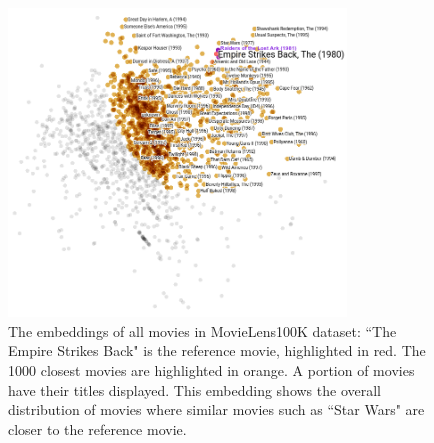 \documentclass[11pt,twocolumn]{article}
\begin{document}
\begin{figure}[!ht]\centering
	\includegraphics[width=0.8\textwidth]{movies-annotation}
	\caption{
		The embeddings of all movies in MovieLens100K dataset:
		``The Empire Strikes Back" is the reference movie, highlighted in red.
		The 1000 closest movies are highlighted in orange.
		A portion of movies have their titles displayed.
		This embedding shows the overall distribution of movies where similar movies such as ``Star Wars" are closer to the reference movie.
	}
	\label{fig:movies}
\end{figure}
\end{document}
